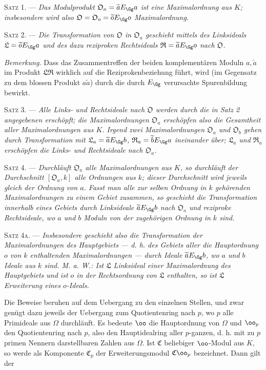 \medskip
\noindent\textsc{Satz 1. ---} \emph{Das Modulprodukt $\mathfrak O_a=\widetilde aE_\Gg a$ ist eine Maximalordnung aus $K$; insbesondere wird also $\mathfrak O=\mathfrak O_o=\widetilde oE_\Gg o$ Maximalordnung.}

\medskip
\noindent\textsc{Satz 2. ---} \emph{Die Transformation von $\mathfrak O$ in $\mathfrak O_a$ geschieht mittels des Linksideals $\mathfrak L=\widetilde oE_\Gg a$ und des dazu reziproken Rechtsideals $\mathfrak R=\widetilde aE_\Gg o$ nach $\mathfrak O$.}

\emph{Bemerkung.} Dass das Zusammentreffen der beiden komplementären Moduln $a,\widetilde a$ im Produkt $\mathfrak L\mathfrak R$ wirklich auf die Reziprokenbeziehung führt, wird (im Gegensatz zu dem blossen Produkt $a\widetilde a$) durch die durch $E_\Gg$ verursachte Spurenbildung bewirkt.

\medskip
\noindent\textsc{Satz 3. ---} \emph{Alle Links- und Rechtsideale nach $\mathfrak O$ werden durch die in Satz 2 angegebenen erschöpft; die Maximalordnungen $\mathfrak O_a$ erschöpfen also die Gesamtheit aller Maximalordnungen aus $K$. Irgend zwei Maximalordnungen $\mathfrak O_a$ und $\mathfrak O_b$ gehen durch Transformation mit $\mathfrak L_a=\widetilde aE_\Gg b$, $\mathfrak R_a=\widetilde bE_\Gg a$ ineinander über; $\mathfrak L_a$ und $\mathfrak R_a$ erschöpfen die Links- und Rechtsideale nach $\mathfrak O_a$.}

\medskip
\noindent\textsc{Satz 4. ---} \emph{Durchläuft $\mathfrak O_a$ alle Maximalordnungen aus $K$, so durchläuft der Durchschnitt $[\mathfrak O_a,k]$ alle Ordnungen aus $k$; dieser Durchschnitt wird jeweils gleich der Ordnung von $a$. Fasst man alle zur selben Ordnung in $k$ gehörenden Maximalordnungen zu einem Gebiet zusammen, so geschieht die Transformation innerhalb eines Gebiets durch Linksideale $\widetilde aE_\Gg b$ nach $\mathfrak O_a$ und reziproke Rechtsideale, wo $a$ und $b$ Moduln von der zugehörigen Ordnung in $k$ sind.}

\medskip
\noindent\textsc{Satz 4a. ---} \emph{Insbesondere geschieht also die Transformation der Maximalordnungen des Hauptgebiets --- d. h. des Gebiets aller die Hauptordnung $o$ von $k$ enthaltenden Maximalordnungen --- durch Ideale $\widetilde aE_\Gg b$, wo $a$ und $b$ Ideale aus $k$ sind. M. a. W.: Ist $\mathfrak L$ Linksideal einer Maximalordnung des Hauptgebiets und ist $o$ in der Rechtsordnung von $\mathfrak L$ enthalten, so ist $\mathfrak L$ Erweiterung eines $o$-Ideals.}

Die Beweise beruhen auf dem Uebergang zu den einzelnen Stellen, und zwar genügt dazu jeweils der Uebergang zum Quotientenring nach $p$, wo $p$ alle Primideale aus $\Omega$ durchläuft. Es bedeute $\oo$ die Hauptordnung von $\Omega$ und $\oo_p$ den Quotientenring nach $p$, also den Hauptidealring aller $p$-ganzen, d. h. mit zu $p$ primen Nennern darstellbaren Zahlen aus $\Omega$. Ist $\mathfrak C$ beliebiger $\oo$-Modul aus $K$, so werde als Komponente $\mathfrak C_p$ der Erweiterungsmodul $\mathfrak C\oo_p$ bezeichnet. Dann gilt der

